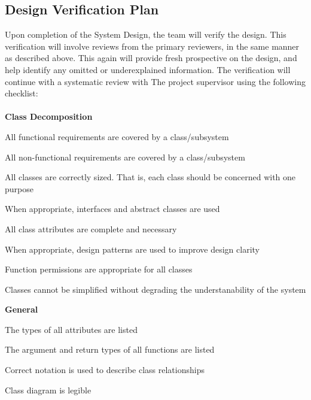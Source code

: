 \documentclass[12pt, titlepage]{article}
\begin{document}


\subsection{Design Verification Plan}
Upon completion of the System Design, the team will verify the design. This verification will involve reviews from the primary reviewers, in the same manner as described above.
This again will provide fresh prospective on the design, and help identify any omitted or underexplained information. The verification will continue with a systematic review with The
project supervisor using the following checklist:\\\\

\textbf{Class Decomposition}\\
\begin{todolist}
  \item All functional requirements are covered by a class/subsystem
  \item All non-functional requirements are covered by a class/subsystem
  \item All classes are correctly sized. That is, each class should be concerned with one purpose
  \item When appropriate, interfaces and abstract classes are used
  \item All class attributes are complete and necessary
  \item When appropriate, design patterns are used to improve design clarity
  \item Function permissions are appropriate for all classes
  \item Classes cannot be simplified without degrading the understanability of the system
  \end{todolist}
  \textbf{General}\\
\begin{todolist}
  \item The types of all attributes are listed
  \item The argument and return types of all functions are listed
  \item Correct notation is used to describe class relationships
  \item Class diagram is legible
  \end{todolist}
\end{document}
